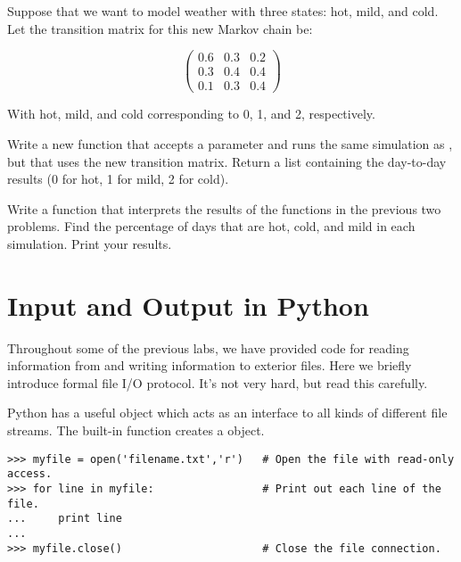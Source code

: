\begin{problem}
Suppose that we want to model weather with three states: hot, mild, and cold.
Let the transition matrix for this new Markov chain be:

\[ \left( \begin{array}{ccc}
0.6 & 0.3 & 0.2\\
0.3 & 0.4 & 0.4\\
0.1 & 0.3 & 0.4\end{array} \right)\]

With hot, mild, and cold corresponding to 0, 1, and 2, respectively.

Write a new function  that accepts a parameter  and runs the same simulation as , but that uses the new transition matrix. Return a list containing the day-to-day results (0 for hot, 1 for mild, 2 for cold).
\end{problem}

\begin{problem}
Write a function  that interprets the results of the functions in the previous two problems.
Find the percentage of days that are hot, cold, and mild in each simulation.
Print your results.
\end{problem}

\section*{Input and Output in Python}

Throughout some of the previous labs, we have provided code for reading information from and writing information to exterior files.
Here we briefly introduce formal file I/O protocol.
It's not very hard, but read this carefully.

Python has a useful  object which acts as an interface to all kinds of different file streams.
The built-in function  creates a  object.

\begin{lstlisting}
>>> myfile = open('filename.txt','r') 	# Open the file with read-only access.
>>> for line in myfile:                 # Print out each line of the file.
... 	print line
...
>>> myfile.close() 						# Close the file connection.
\end{lstlisting}

